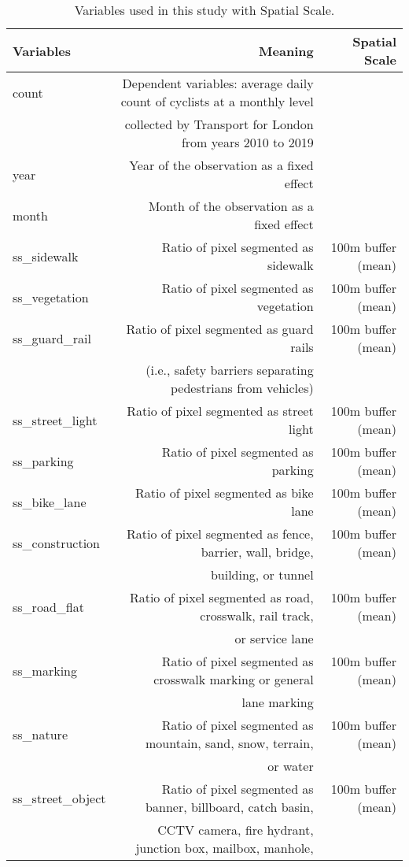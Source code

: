 \documentclass[preprint,12pt, authoryear]{elsarticle}
\begin{document}
\begin{table}[!ht]\centering
\caption{Variables used in this study with Spatial Scale.}\label{result:tab:variables}
\tiny
\begin{tabular}{lrr}\toprule
Variables & Meaning & Spatial Scale \\\midrule
count & Dependent variables: average daily count of cyclists at a monthly level & \\
 & collected by Transport for London from years 2010 to 2019 & \\
year & Year of the observation as a fixed effect & \\
month & Month of the observation as a fixed effect & \\
ss\_sidewalk & Ratio of pixel segmented as sidewalk & 100m buffer (mean) \\
ss\_vegetation & Ratio of pixel segmented as vegetation & 100m buffer (mean) \\
ss\_guard\_rail & Ratio of pixel segmented as guard rails & 100m buffer (mean) \\
 & (i.e., safety barriers separating pedestrians from vehicles) & \\
ss\_street\_light & Ratio of pixel segmented as street light & 100m buffer (mean) \\
ss\_parking & Ratio of pixel segmented as parking & 100m buffer (mean) \\
ss\_bike\_lane & Ratio of pixel segmented as bike lane & 100m buffer (mean) \\
ss\_construction & Ratio of pixel segmented as fence, barrier, wall, bridge, & 100m buffer (mean) \\
 & building, or tunnel & \\
ss\_road\_flat & Ratio of pixel segmented as road, crosswalk, rail track, & 100m buffer (mean) \\
 & or service lane & \\
ss\_marking & Ratio of pixel segmented as crosswalk marking or general & 100m buffer (mean) \\
 & lane marking & \\
ss\_nature & Ratio of pixel segmented as mountain, sand, snow, terrain, & 100m buffer (mean) \\
 & or water & \\
ss\_street\_object & Ratio of pixel segmented as banner, billboard, catch basin, & 100m buffer (mean) \\
 & CCTV camera, fire hydrant, junction box, mailbox, manhole, & \\

\end{tabular}
\end{table}
\end{document}
